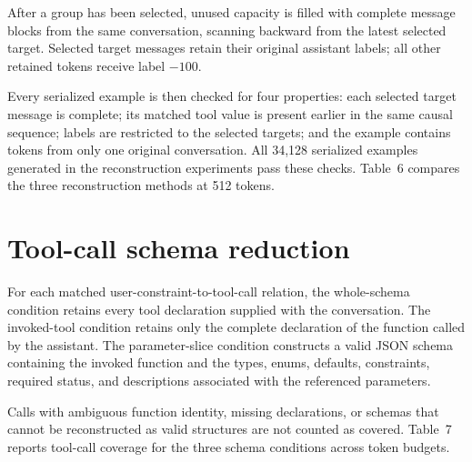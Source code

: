\documentclass[pdflatex,sn-basic,Numbered]{sn-jnl}
\begin{document}
\begin{appendices}
After a group has been selected, unused capacity is filled with complete message blocks from the
same conversation, scanning backward from the latest selected target. Selected target messages
retain their original assistant labels; all other retained tokens receive label $-100$.

Every serialized example is then checked for four properties: each selected target message is
complete; its matched tool value is present earlier in the same causal sequence; labels are
restricted to the selected targets; and the example contains tokens from only one original
conversation. All 34,128 serialized examples generated in the reconstruction experiments pass
these checks. Table~6 compares the three reconstruction methods at 512 tokens.

\begin{table}[ht]
\centering
\caption{
Comparison of training-example reconstruction methods at 512 tokens. Input-token ratio is the
number of reconstructed input tokens divided by the number of tokens in the original rendered
corpus. Examples per conversation use all original conversations as the denominator.
}
\resizebox{\textwidth}{!}{}
\end{table}


\section{Tool-call schema reduction}

For each matched user-constraint-to-tool-call relation, the whole-schema condition retains every
tool declaration supplied with the conversation. The invoked-tool condition retains only the
complete declaration of the function called by the assistant. The parameter-slice condition
constructs a valid JSON schema containing the invoked function and the types, enums, defaults,
constraints, required status, and descriptions associated with the referenced parameters.

Calls with ambiguous function identity, missing declarations, or schemas that cannot be
reconstructed as valid structures are not counted as covered. Table~7 reports tool-call coverage for the three schema conditions across token budgets.

\begin{table}[ht]
\centering
\caption{
Fraction of matched tool-call targets that fit within the token budget together with the relevant
user constraint, complete assistant tool call, and specified schema content.
}
\resizebox{0.85\textwidth}{!}{}
\end{table}


\end{appendices}
\end{document}
